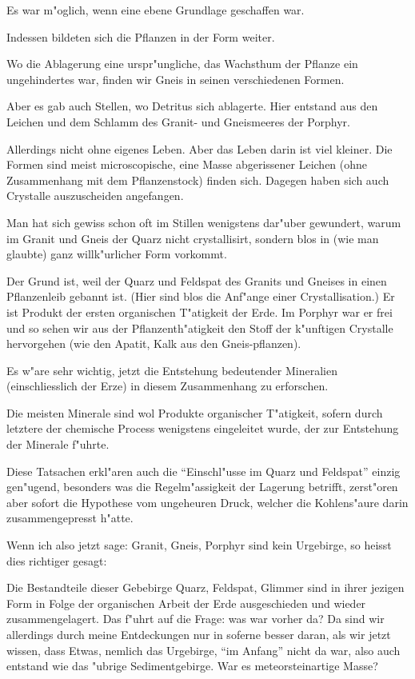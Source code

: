 \documentclass[a4paper, 11pt, oneside, german]{article}
\begin{document}
Es war m"oglich, wenn eine ebene Grundlage geschaffen war.

Indessen bildeten sich die Pflanzen in der Form weiter.

Wo die Ablagerung eine urspr"ungliche, das Wachsthum der Pflanze ein ungehindertes war, finden wir Gneis in seinen verschiedenen Formen.

Aber es gab auch Stellen, wo Detritus sich ablagerte. Hier entstand aus den Leichen und dem Schlamm des Granit- und Gneismeeres der Porphyr.

Allerdings nicht ohne eigenes Leben. Aber das Leben darin ist viel kleiner. Die Formen sind meist microscopische, eine Masse abgerissener Leichen (ohne Zusammenhang mit dem Pflanzenstock) finden sich. Dagegen haben sich auch Crystalle auszuscheiden angefangen.

Man hat sich gewiss schon oft im Stillen wenigstens dar"uber gewundert, warum im Granit und Gneis der Quarz nicht crystallisirt, sondern blos in (wie man glaubte) ganz willk"urlicher Form vorkommt.

Der Grund ist, weil der Quarz und Feldspat des Granits und Gneises in einen Pflanzenleib gebannt ist. (Hier sind blos die Anf"ange einer Crystallisation.) Er ist Produkt der ersten organischen T"atigkeit der Erde. Im Porphyr war er frei und so sehen wir aus der Pflanzenth"atigkeit den Stoff der k"unftigen Crystalle hervorgehen (wie den Apatit, Kalk aus den Gneis-pflanzen).

Es w"are sehr wichtig, jetzt die Entstehung bedeutender Mineralien (einschliesslich der Erze) in diesem Zusammenhang zu erforschen.

Die meisten Minerale sind wol Produkte organischer T"atigkeit, sofern durch letztere der chemische Process wenigstens eingeleitet wurde, der zur Entstehung der Minerale f"uhrte.

Diese Tatsachen erkl"aren auch die "`Einschl"usse im Quarz und Feldspat"' einzig gen"ugend, besonders was die Regelm"assigkeit der Lagerung betrifft, zerst"oren aber sofort die Hypothese vom ungeheuren Druck, welcher die Kohlens"aure darin zusammengepresst h"atte.

Wenn ich also jetzt sage: Granit, Gneis, Porphyr sind kein Urgebirge, so heisst dies richtiger gesagt:

Die Bestandteile dieser Gebebirge Quarz, Feldspat, Glimmer sind in ihrer jezigen Form in Folge der organischen Arbeit der Erde ausgeschieden und wieder zusammengelagert. Das f"uhrt auf die Frage: was war vorher da? Da sind wir allerdings durch meine Entdeckungen nur in soferne besser daran, als wir jetzt wissen, dass Etwas, nemlich das Urgebirge, "`im Anfang"' nicht da war, also auch entstand wie das "ubrige Sedimentgebirge. War es meteorsteinartige Masse?
\end{document}
